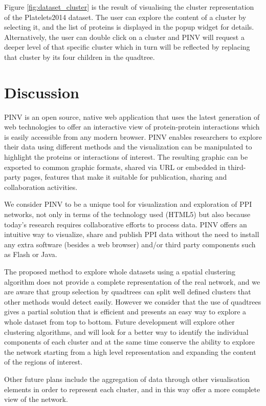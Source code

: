 \begin{description}
Figure \ref{fig:dataset_cluster} is the result of visualising the cluster representation of the Platelets2014 dataset. The user can explore the content of a cluster by selecting it, and the list of proteins is displayed in the popup widget for details. Alternatively, the user can double click on a cluster and PINV will request a deeper level of that specific cluster which in turn will be reflected by replacing that cluster by its four children in the quadtree.


\end{description}
\section{Discussion}
PINV is an open source, native web application that uses the latest generation of web technologies to offer an interactive view of protein-protein interactions which is easily accessible from any modern browser. PINV enables researchers to explore their data using different methods and the visualization can be manipulated to highlight the proteins or interactions of interest. The resulting graphic can be exported to common graphic formats, shared via URL or embedded in third-party pages, features that make it suitable for publication, sharing and collaboration activities.

We consider PINV to be a unique tool for visualization and exploration of PPI networks, not only in terms of the technology used (HTML5) but also because today's research requires collaborative efforts to process data. PINV offers an intuitive way to visualize, share and publish PPI data without the need to install any extra software (besides a web browser) and/or third party components such as Flash or Java.

The proposed method to explore whole datasets using a spatial clustering algorithm does not provide a complete representation of the real network, and we are aware that group selection by quadtrees can split well defined clusters that other methods would detect easily. However we consider that the use of quadtrees gives a partial solution that is efficient and presents an easy way to explore a whole dataset from top to bottom. Future development will explore other clustering algorithms,  and will look for a better way to  identify the individual components of each cluster and at the same time conserve the ability to explore the network starting from a high level representation and expanding the content of the regions of interest.

Other future plans include the aggregation of data through other visualisation elements in order to represent each cluster, and in this way offer a more complete view of the network.

 
